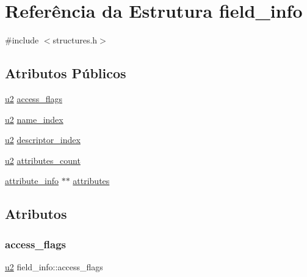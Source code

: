 \hypertarget{structfield__info}{}\section{Referência da Estrutura field\+\_\+info}
\label{structfield__info}


{\ttfamily \#include $<$structures.\+h$>$}

\subsection*{Atributos Públicos}
\begin{DoxyCompactItemize}
\item 
\hyperlink{lista__operandos_8h_a732cde1300aafb73b0ea6c2558a7a54f}{u2} \hyperlink{structfield__info_aa622dc9a5b5353d2f3eb2f416dacab4b}{access\+\_\+flags}
\item 
\hyperlink{lista__operandos_8h_a732cde1300aafb73b0ea6c2558a7a54f}{u2} \hyperlink{structfield__info_a425e3ae85badd81c67ef00acca85ad9e}{name\+\_\+index}
\item 
\hyperlink{lista__operandos_8h_a732cde1300aafb73b0ea6c2558a7a54f}{u2} \hyperlink{structfield__info_a12dd492b7fb1d61da1ac14938d97b07f}{descriptor\+\_\+index}
\item 
\hyperlink{lista__operandos_8h_a732cde1300aafb73b0ea6c2558a7a54f}{u2} \hyperlink{structfield__info_a83bfa4ff84a608e3dbd1c3968ebe1b80}{attributes\+\_\+count}
\item 
\hyperlink{structattribute__info}{attribute\+\_\+info} $\ast$$\ast$ \hyperlink{structfield__info_a754de0f0fd6e62c413cca2979ca5debd}{attributes}
\end{DoxyCompactItemize}


\subsection{Atributos}
\mbox{\label{structfield__info_aa622dc9a5b5353d2f3eb2f416dacab4b}} 
\subsubsection{\texorpdfstring{access\+\_\+flags}{access\_flags}}
{\footnotesize\ttfamily \hyperlink{lista__operandos_8h_a732cde1300aafb73b0ea6c2558a7a54f}{u2} field\+\_\+info\+::access\+\_\+flags}

